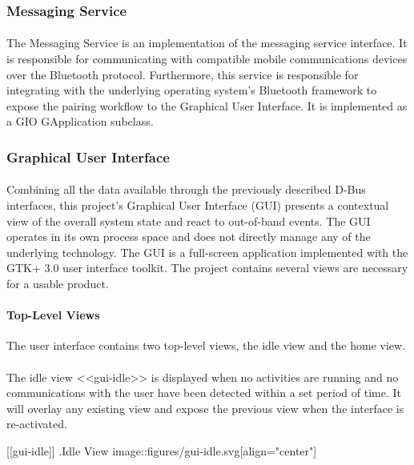 \subsubsection{Messaging Service}

\paragraph{}
The Messaging Service is an implementation of the messaging service interface.
It is responsible for communicating with compatible mobile communications devices over the Bluetooth protocol.
Furthermore, this service is responsible for integrating with the underlying operating system's Bluetooth framework to expose the pairing workflow to the Graphical User Interface.
It is implemented as a GIO GApplication subclass.

\subsubsection{Graphical User Interface}

\paragraph{}
Combining all the data available through the previously described D-Bus interfaces, this project's Graphical User Interface (GUI) presents a contextual view of the overall system state and react to out-of-band events.
The GUI operates in its own process space and does not directly manage any of the underlying technology.
The GUI is a full-screen application implemented with the GTK+ 3.0 user interface toolkit.
The project contains several views are necessary for a usable product.

\paragraph{Top-Level Views}
The user interface contains two top-level views, the idle view and the home view.

\paragraph{}
The idle view <<gui-idle>> is displayed when no activities are running and no communications with the user have been detected within a set period of time.
It will overlay any existing view and expose the previous view when the interface is re-activated.

[[gui-idle]]
.Idle View
image::figures/gui-idle.svg[align="center"]


